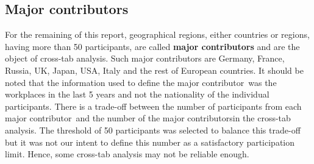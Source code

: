 \documentclass[preprint,5p,times]{elsarticle}
\def\mcountry{major contributor\xspace{}}%
\def\mcountries{major contributors\xspace{}}%
\def\Mcountries{Major contributors\xspace{}}%
\begin{document}
\subsection*{\Mcountries}

For the remaining of this report, geographical regions, either countries or
regions, having more than 50 participants, are called {\bf major contributors}
and are the object of cross-tab analysis. Such major contributors are Germany,
France, Russia, UK, Japan, USA, Italy and the rest of European countries. It
should be noted that the information used to define the \mcountry\ was the
workplaces in the last 5 years and not the nationality of the individual
participants.
%
There is a trade-off between the number of participants from each \mcountry\ and
the number of the \mcountries in the cross-tab analysis. The threshold of 50
participants was selected to balance this trade-off but it was not our intent to
define this number as a satisfactory participation limit. Hence, some cross-tab
analysis may not be reliable enough.
%
\end{document}
